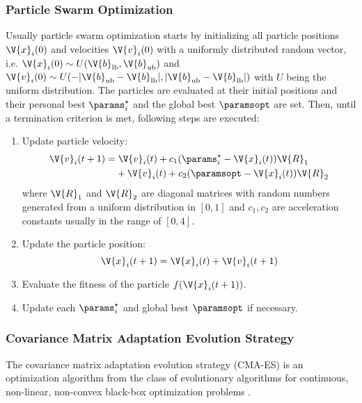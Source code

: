 \subsubsection{Particle Swarm Optimization}

Usually particle swarm optimization starts by initializing all particle positions $\V{x}_i(0)$ and velocities $\V{v}_i(0)$ with a uniformly distributed random vector, i.e. $\V{x}_i(0) \sim  U(\V{b}_\text{lb},\V{b}_\text{ub})$ and $\V{v}_i(0) \sim  U(-\vert \V{b}_\text{ub} - \V{b}_\text{lb} \vert,\vert \V{b}_\text{ub} - \V{b}_\text{lb} \vert)$ with $U$ being the uniform distribution. The particles are evaluated at their initial positions and their personal best $\params_i^\star$ and the global best $\paramsopt$ are set.
Then, until a termination criterion is met, following steps are executed:
\begin{enumerate}
\item Update particle velocity:
\begin{align*}
\V{v}_i(t+1)=&\;\V{v}_i(t)+c_1(\params_i^\star-\V{x}_i(t))\V{R}_1\\
&+\V{v}_i(t)+c_2(\paramsopt-\V{x}_i(t))\V{R}_2
\end{align*}
where $\V{R}_1$ and $\V{R}_2$ are diagonal matrices with random numbers generated from a uniform distribution in $[0,1]$ and $c_1,c_2$ are acceleration constants usually in the range of $[0,4]$.
\item Update the particle position:
\begin{equation}
\V{x}_i(t+1)=\V{x}_i(t)+\V{v}_i(t+1)
\end{equation}
\item Evaluate the fitness of the particle $f(\V{x}_i(t+1))$.
\item Update each $\params_i^\star$ and global best $\paramsopt$ if necessary.
\end{enumerate}

\subsubsection{Covariance Matrix Adaptation Evolution Strategy}

The covariance matrix adaptation evolution strategy (CMA-ES) is an optimization algorithm from the class of evolutionary algorithms for continuous, non-linear, non-convex black-box optimization problems \cite{Hansen.2001,Hansen.2006}.

